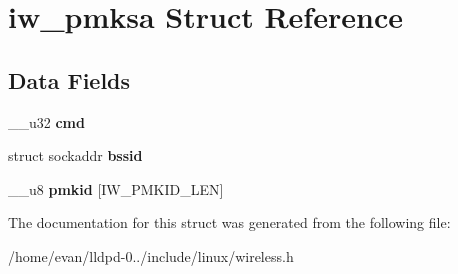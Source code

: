 \section{iw\-\_\-pmksa \-Struct \-Reference}
\label{structiw__pmksa}
\subsection*{\-Data \-Fields}
\begin{DoxyCompactItemize}
\item 
\-\_\-\-\_\-u32 {\bfseries cmd}\label{structiw__pmksa_a66d231264d5aa36fd7d347e2c967769a}

\item 
struct sockaddr {\bfseries bssid}\label{structiw__pmksa_a183880506ceb65b79693d9daf7875a08}

\item 
\-\_\-\-\_\-u8 {\bfseries pmkid} [\-I\-W\-\_\-\-P\-M\-K\-I\-D\-\_\-\-L\-E\-N]\label{structiw__pmksa_afa7562ebfa666b4fb2f00a9562945e7b}

\end{DoxyCompactItemize}


\-The documentation for this struct was generated from the following file\-:\begin{DoxyCompactItemize}
\item 
/home/evan/lldpd-\/0../include/linux/wireless.\-h\end{DoxyCompactItemize}
